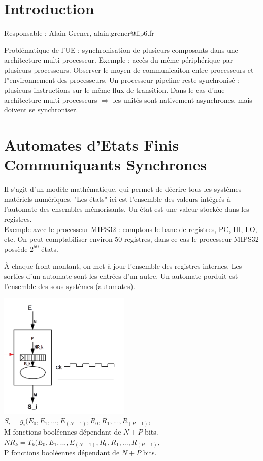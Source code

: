 \section{Introduction}
Responsable : Alain Grener, alain.grener@lip6.fr

Problématique de l'UE : synchronisation de plusieurs composants dans une architecture
multi-processeur. Exemple : accès du même périphérique par plusieurs processeurs.
Observer le moyen de communicaiton entre processeurs et l''environnement des
processeurs.
Un processeur pipeline reste synchronisé : plusieurs instructions sur le même flux
de transition. Dans le cas d'nue architecture multi-processeurs $\Rightarrow$
les unités sont nativement asynchrones, mais doivent se synchroniser.

\section{Automates d'Etats Finis Communiquants Synchrones}

Il s'agit d'un modèle mathématique, qui permet de décrire tous les systèmes
matériels numériques.
"Les états" ici est l'ensemble des valeurs intégrés à l'automate des ensembles
mémorisants. Un état est une valeur stockée dans les registres.\\

Exemple avec le processeur MIPS32 : comptons le banc de registres, PC, HI, LO, etc.
On peut comptabiliser environ 50 registres, dans ce cas le processeur MIPS32
possède $2^{50}$ états.

À chaque front montant, on met à jour l'ensemble des registres internes.
Les sorties d'un automate sont les entrées d'un autre.
Un automate porduit est l'ensemble des sous-systèmes (automates). \\


\begin{center}
  \includegraphics[height=6cm]{cours1/pics/automata.png}\\
  \(S_i=g_i(E_0,E_1,...,E_{(N-1)},R_0, R_1,...,R_{(P-1)}\), \\
  M fonctions booléennes dépendant de $N+P$ bits. \\
  \(NR_k=T_k(E_0,E_1,...,E_{(N-1)},R_0, R_1,...,R_{(P-1)}\), \\
  P fonctions booléennes dépendant de $N+P$ bits. \\
\end{center}

